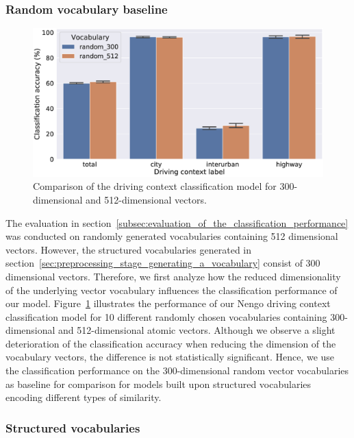 \subsubsection{Random vocabulary baseline}%
\label{ssubsec:random_vocabulary_baseline}

\begin{figure}[t]
    \centering
    \includegraphics[width=1.\linewidth]{imgs/context_class_random_512_vs_random_300_dim_vocab.eps}
    \caption{Comparison of the driving context classification model for \num{300}-dimensional and \num{512}-dimensional vectors.}
    \label{fig:context_class_random_512_vs_random_300_dim_vocab}
\end{figure}

The evaluation in section~\ref{subsec:evaluation_of_the_classification_performance} was conducted on randomly generated vocabularies containing \num{512} dimensional vectors.
However, the structured vocabularies generated in section~\ref{sec:preprocessing_stage_generating_a_vocabulary} consist of \num{300} dimensional vectors.
Therefore, we first analyze how the reduced dimensionality of the underlying vector vocabulary influences the classification performance of our model.
Figure~\ref{fig:context_class_random_512_vs_random_300_dim_vocab} illustrates the performance of our \ac{Nengo} driving context classification model for \num{10} different randomly chosen vocabularies containing \num{300}-dimensional and \num{512}-dimensional atomic vectors.
Although we observe a slight deterioration of the classification accuracy when reducing the dimension of the vocabulary vectors, the difference is not statistically significant.
Hence, we use the classification performance on the \num{300}-dimensional random vector vocabularies as baseline for comparison for models built upon structured vocabularies encoding different types of similarity.

\subsubsection{Structured vocabularies}%
\label{ssubsec:structured_vocabularies}

